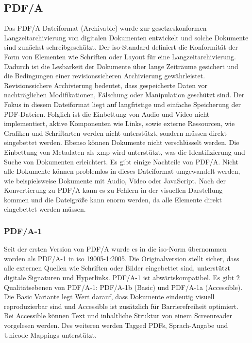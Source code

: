 \subsection{PDF/A}
Das PDF/A Dateiformat (Archivable) wurde zur gesetzeskonformen Langzeitarchivierung von digitalen Dokumenten entwickelt und solche Dokumente sind zunächst schreibgeschützt. Der \gls{iso}-Standard definiert die Konformität der Form von Elementen wie Schriften oder Layout für eine Langzeitarchivierung. Dadurch ist die Lesbarkeit der Dokumente über lange Zeiträume gesichert und die Bedingungen einer revisionssicheren Archivierung gewährleistet. \cite{adobe-pdf-a} Revisionssichere Archivierung bedeutet, dass gespeicherte Daten vor nachträglichen Modifikationen, Fälschung oder Manipulation geschützt sind. \cite{adobe-revisions} Der Fokus in diesem Dateiformat liegt auf langfristige und einfache Speicherung der PDF-Dateien. Folglich ist die Einbettung von Audio und Video nicht implementiert, aktive Komponenten wie Links, sowie externe Ressourcen, wie Grafiken und Schriftarten werden nicht unterstützt, sondern müssen direkt eingebettet werden. Ebenso können Dokumente nicht verschlüsselt werden. Die Einbettung von Metadaten als \gls{xmp} wird unterstützt, was die Identifizierung und Suche von Dokumenten erleichtert. Es gibt einige Nachteile von PDF/A. Nicht alle Dokumente können problemlos in dieses Dateiformat umgewandelt werden, wie beispielsweise Dokumente mit Audio, Video oder JavaScript. Nach der Konvertierung zu PDF/A kann es zu Fehlern in der visuellen Darstellung kommen und die Dateigröße kann enorm werden, da alle Elemente direkt eingebettet werden müssen. \cite{adobe-pdf-a}

\subsubsection{PDF/A-1}
Seit der ersten Version von PDF/A wurde es in die \gls{iso}-Norm übernommen worden als PDF/A-1 in \gls{iso} 19005-1:2005. \cite{proj-consult} Die Originalversion stellt sicher, dass alle externen Quellen wie Schriften oder Bilder eingebettet sind, unterstützt digitale Signaturen und Hyperlinks. PDF/A-1 ist abwärtskompatibel. Es gibt 2 Qualitätsebenen von PDF/A-1: PDF/A-1b (Basic) und PDF/A-1a (Accessible). Die Basic Variante legt Wert darauf, dass Dokumente eindeutig visuell reproduzierbar sind und Accessible ist zusätzlich für Barrierefreiheit optimiert. Bei Accessible können Text und inhaltliche Struktur von einem Screenreader vorgelesen werden. \cite{adobe-pdf-a} Des weiteren werden Tagged PDFs, Sprach-Angabe und Unicode Mappings unterstützt. \cite{proj-consult}


